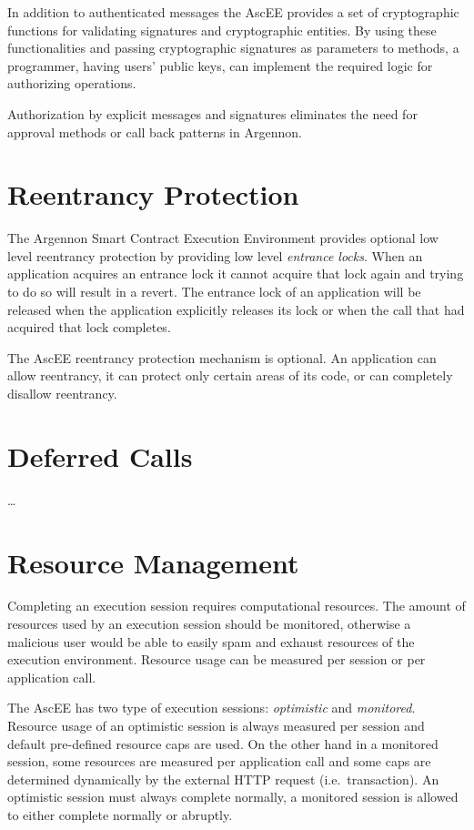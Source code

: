 In addition to authenticated messages the AscEE provides a set of
cryptographic functions for validating signatures and cryptographic entities. By using these functionalities and
passing cryptographic signatures as parameters to methods, a programmer, having users' public keys, can implement
the required logic for authorizing operations.

Authorization by explicit messages and signatures eliminates the need for approval methods or call back patterns in
Argennon.



\section{Reentrancy Protection}\label{sec:reentrancy}

The Argennon Smart Contract Execution Environment provides optional low level reentrancy protection by providing low
level \emph{entrance locks}. When an application acquires an entrance lock it cannot acquire that lock again and trying
to do so will result in a revert. The entrance lock of an application will be released when the application explicitly
releases its lock or when the call that had acquired that lock completes.

The AscEE reentrancy protection mechanism is optional. An application can allow reentrancy, it can protect only certain
areas of its code, or can completely disallow reentrancy.


\section{Deferred Calls}\label{sec:deferred-calls}

\ldots


\section{Resource Management}\label{sec:res-man}

Completing an execution session requires computational resources. The amount of resources used by an execution session
should be monitored, otherwise a malicious user would be able to easily spam and exhaust resources of the execution
environment. Resource usage can be measured per session or per application call.

The AscEE has two type of execution sessions: \emph{optimistic} and \emph{monitored}. Resource usage of an optimistic
session is always measured per session and default pre-defined resource caps are used. On the other hand in a monitored
session, some resources are measured per application call and some
caps are determined dynamically by the external HTTP request (i.e.\ transaction). An optimistic session must always
complete normally, a monitored session is allowed to either complete normally or abruptly.

